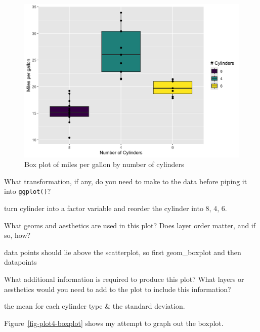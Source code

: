 \documentclass[
  man,
  floatsintext,
  longtable,
  nolmodern,
  notxfonts,
  notimes,
  colorlinks=true,linkcolor=blue,citecolor=blue,urlcolor=blue]{apa7}
\begin{document}
\begin{figure}[H]

\caption{Box plot of miles per gallon by number of cylinders}

{\centering \includegraphics{plots/plot4.png}

}

\end{figure}%

What transformation, if any, do you need to make to the data before
piping it into \texttt{ggplot()}?

turn cylinder into a factor variable and reorder the cylinder into 8, 4,
6.

What geoms and aesthetics are used in this plot? Does layer order
matter, and if so, how?

data points should lie above the scatterplot, so first geom\_boxplot and
then datapoints

What additional information is required to produce this plot? What
layers or aesthetics would you need to add to the plot to include this
information?

the mean for each cylinder type \& the standard deviation.

Figure~\ref{fig-plot4-boxplot} shows my attempt to graph out the
boxplot.
\end{document}
